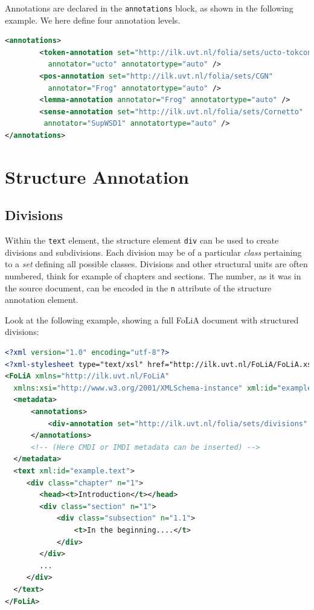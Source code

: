 \documentclass[a4paper,12pt]{report}
\begin{document}
Annotations are declared in the \texttt{annotations} block, as shown in the following example. We here define four annotation levels.

\begin{lstlisting}[language=xml]
<annotations>
        <token-annotation set="http://ilk.uvt.nl/folia/sets/ucto-tokconfig-nl" 
          annotator="ucto" annotatortype="auto" />
        <pos-annotation set="http://ilk.uvt.nl/folia/sets/CGN" 
          annotator="Frog" annotatortype="auto" />
        <lemma-annotation annotator="Frog" annotatortype="auto" />    
        <sense-annotation set="http://ilk.uvt.nl/folia/sets/Cornetto"
         annotator="SupWSD1" annotatortype="auto" />    
</annotations>
\end{lstlisting}



\section{Structure Annotation}

\subsection{Divisions}

Within the \texttt{text} element, the structure element \texttt{div} can be used to create divisions and subdivisions. Each division may be of a particular \emph{class} pertaining to a \emph{set} defining all possible classes. Divisions and other structural units are often numbered, think for example of chapters and sections. The number, as it was in the source document, can be encoded in the \texttt{n} attribute of the structure annotation element.

Look at the following example, showing a full FoLiA document with structured divisions: 

\begin{lstlisting}[language=xml]
<?xml version="1.0" encoding="utf-8"?>
<?xml-stylesheet type="text/xsl" href="http://ilk.uvt.nl/FoLiA/FoLiA.xsl"?>
<FoLiA xmlns="http://ilk.uvt.nl/FoLiA"
  xmlns:xsi="http://www.w3.org/2001/XMLSchema-instance" xml:id="example">
  <metadata>
      <annotations>
          <div-annotation set="http://ilk.uvt.nl/folia/sets/divisions" />
      </annotations>    
      <!-- (Here CMDI or IMDI metadata can be inserted) -->
  </metadata>
  <text xml:id="example.text">
     <div class="chapter" n="1">
        <head><t>Introduction</t></head>
        <div class="section" n="1">
            <div class="subsection" n="1.1">
                <t>In the beginning....</t>
            </div>
        </div>
        ...
     </div>
  </text>
</FoLiA>  
\end{lstlisting}
\end{document}
